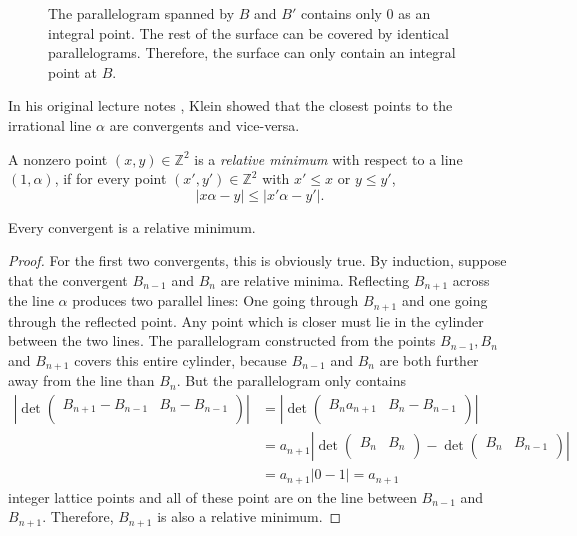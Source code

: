\begin{figure}[tb]
  \centering
  
  \caption{
    The parallelogram spanned by $B$ and $B'$ contains only $0$ as an integral point.
    The rest of the surface can be covered by identical parallelograms.
    Therefore, the surface can only contain an integral point at $B$.
  }
\end{figure}

In his original lecture notes \cite{Klein95},
Klein showed that the closest points to the irrational line $α$ are convergents and
vice-versa.

\begin{definition}
  A nonzero point $(x, y) ∈ ℤ^2$ is a \emph{relative minimum} with respect to a
  line $(1, α)$, if for every point $(x', y') ∈ ℤ^2$ with $x' ≤ x$ or $y ≤ y'$,
  \[
    |x α - y| ≤ |x' α - y'|.
  \]
\end{definition}

\begin{theorem}
  \label{thm:conv-is-relmin}
  Every convergent is a relative minimum.
\end{theorem}

\begin{proof}
  For the first two convergents, this is obviously true.
  By induction, suppose that the convergent $B_{n-1}$ and $B_n$ are relative minima.
  Reflecting $B_{n+1}$ across the line $α$ produces two parallel lines:
  One going through $B_{n+1}$ and one going through the reflected point.
  Any point which is closer must lie in the cylinder between the two lines.
  The parallelogram constructed from the points $B_{n-1}, B_n$ and $B_{n+1}$
  covers this entire cylinder, because $B_{n-1}$ and $B_n$ are both further
  away from the line than $B_n$.
  But the parallelogram only contains
  \begin{align*}
    |\det \begin{pmatrix}
      B_{n+1} - B_{n-1} & B_n - B_{n-1} \\
    \end{pmatrix}|
    & = |\det \begin{pmatrix}
      B_n a_{n+1} & B_n - B_{n-1} \\
    \end{pmatrix}| \\
    & = a_{n+1} |\det \begin{pmatrix}
      B_n & B_n \\
    \end{pmatrix} - \det \begin{pmatrix}
      B_n & B_{n-1} \\
    \end{pmatrix}| \\
    & = a_{n+1} |0 - 1| = a_{n+1}
  \end{align*}
  integer lattice points
  and all of these point are on the line between $B_{n-1}$ and $B_{n+1}$.
  Therefore, $B_{n+1}$ is also a relative minimum.
\end{proof}

